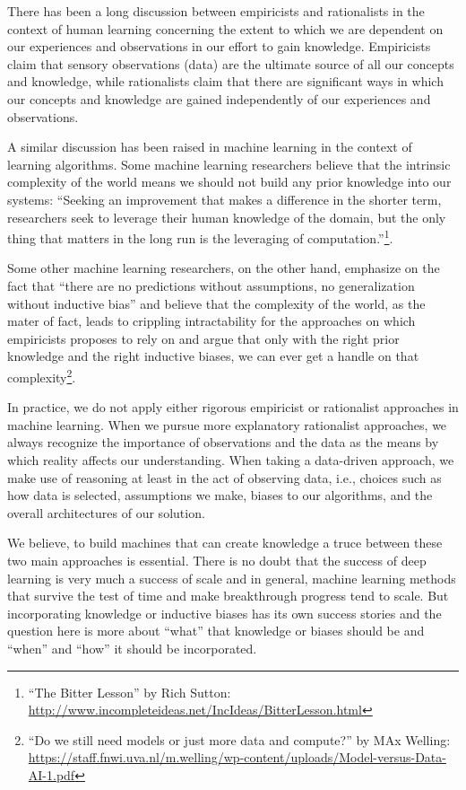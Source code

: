 There has been a long discussion between empiricists and rationalists in the context of human learning concerning the extent to which we are dependent on our experiences and observations in our effort to gain knowledge.  
%
Empiricists claim that sensory observations (data) are the ultimate source of all our concepts and knowledge, while rationalists claim that there are significant ways in which our concepts and knowledge are gained independently of our experiences and observations. 

A similar discussion has been raised in machine learning in the context of learning algorithms.
%
Some machine learning researchers believe that the intrinsic complexity of the world means we should not build any prior knowledge into our systems: ``Seeking an improvement that makes a difference in the shorter term, researchers seek to leverage their human knowledge of the domain, but the only thing that matters in the long run is the leveraging of computation.''\footnote{``The Bitter Lesson'' by Rich Sutton: \url{http://www.incompleteideas.net/IncIdeas/BitterLesson.html}}. 

Some other machine learning researchers, on the other hand, emphasize on the fact that ``there are no predictions without assumptions, no generalization without inductive bias'' and believe that the complexity of the world, as the mater of fact, leads to crippling intractability for the approaches on which empiricists proposes to rely on and argue that only with the right prior knowledge and the right inductive biases, we can ever get a handle on that complexity\footnote{``Do we still need models or just more data and compute?'' by MAx Welling: \url{https://staff.fnwi.uva.nl/m.welling/wp-content/uploads/Model-versus-Data-AI-1.pdf}}.

In practice, we do not apply either rigorous empiricist or rationalist approaches in machine learning.  When we pursue more explanatory rationalist approaches, we always recognize the importance of observations and the data as the means by which reality affects our understanding.  When taking a data-driven approach, we make use of reasoning at least in the act of observing data, i.e., choices such as how data is selected, assumptions we make, biases to our algorithms, and the overall architectures of our solution. 

We believe, to build machines that can create knowledge a truce between these two main approaches is essential.
There is no doubt that the success of deep learning is very much a success of scale and in general, machine learning methods that survive the test of time and make breakthrough progress tend to scale.
But incorporating knowledge or inductive biases has its own success stories and the question here is more about ``what'' that knowledge or biases should be and ``when'' and ``how'' it should be incorporated. 

